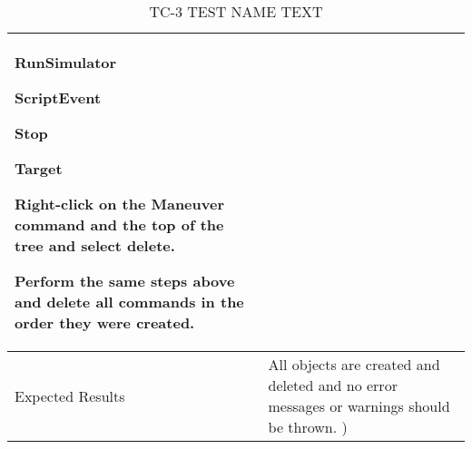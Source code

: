 \begin{table}[htbp!]
\begin{tabular}{|p{1.05 in} |p{4.75 in} |}
\begin{compactenum}
\begin{compactenum}
                    \item RunSimulator
                    \item ScriptEvent
                    \item Stop
                    \item Target
                \end{compactenum}
                \item Right-click on the Maneuver command and the top of the tree and select delete.
                \item Perform the same steps above and delete all commands in the order they were created.
         \end{compactenum}
         \\ \hline
         Expected Results & All objects are created and deleted and no error messages or warnings should be thrown.  )\\
      \hline
      \end{tabular}
      \label{Table:TC-3}
      \caption{TC-3 TEST NAME TEXT}
\end{table} 